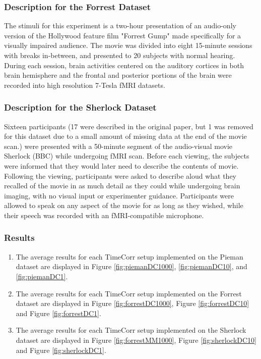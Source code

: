 \documentclass[11pt]{article}
\begin{document}
\subsubsection{Description for the Forrest Dataset}
The stimuli for this experiment is a two-hour presentation of an audio-only version of the Hollywood feature film "Forrest Gump" made specifically for a visually impaired audience. The movie was divided into eight 15-minute sessions with breaks in-between, and presented to 20 subjects with normal hearing. During each session, brain activities centered on the auditory cortices in both brain hemisphere and the frontal and posterior portions of the brain were recorded into high resolution 7-Tesla fMRI datasets.\cite{Hanke2014}

\subsubsection{Description for the Sherlock Dataset}
Sixteen participants (17 were described in the original paper, but 1 was removed for this dataset due to a small amount of missing data at the end of the movie scan.) were presented with a 50-minute segment of the audio-visual movie Sherlock (BBC) while undergoing fMRI scan. Before each viewing, the subjects were informed that they would later need to describe the contents of movie. Following the viewing, participants were asked to describe aloud what they recalled of the movie in as much detail as they could while undergoing brain imaging, with no visual input or experimenter guidance. Participants were allowed to speak on any aspect of the movie for as long as they wished, while their speech was recorded with an fMRI-compatible microphone. \cite{Chen2017}

\subsubsection{Results}
\begin{enumerate}
\item The average results for each TimeCorr setup implemented on the Pieman dataset are displayed in Figure \ref{fig:piemanDC1000}, \ref{fig:piemanDC10}, and \ref{fig:piemanDC1}.
\item The average results for each TimeCorr setup implemented on the Forrest dataset are displayed in Figure \ref{fig:forrestDC1000}, Figure \ref{fig:forrestDC10} and Figure \ref{fig:forrestDC1}.
\item The average results for each TimeCorr setup implemented on the Sherlock dataset are displayed in Figure \ref{fig:forrestMM1000}, Figure \ref{fig:sherlockDC10} and Figure \ref{fig:sherlockDC1}.
\end{enumerate}
\end{document}
